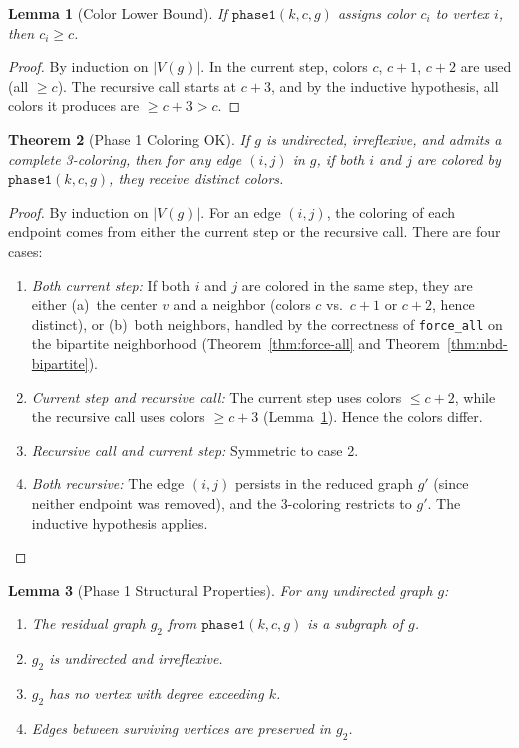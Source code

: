 \documentclass[11pt]{article}
\theoremstyle{plain}
\newtheorem{theorem}{Theorem}[section]
\newtheorem{lemma}[theorem]{Lemma}
\theoremstyle{definition}
\theoremstyle{remark}
\begin{document}
\begin{lemma}[Color Lower Bound]
\label{lem:phase1-lower}
If $\texttt{phase1}(k, c, g)$ assigns color $c_i$ to vertex $i$, then $c_i \ge c$.
\end{lemma}

\begin{proof}
By induction on $|V(g)|$. In the current step, colors $c$, $c{+}1$, $c{+}2$ are used (all $\ge c$). The recursive call starts at $c{+}3$, and by the inductive hypothesis, all colors it produces are $\ge c{+}3 > c$.
\end{proof}

\begin{theorem}[Phase 1 Coloring OK]
\label{thm:phase1-ok}
If $g$ is undirected, irreflexive, and admits a complete 3-coloring, then for any edge $(i,j)$ in $g$, if both $i$ and $j$ are colored by $\texttt{phase1}(k, c, g)$, they receive distinct colors.
\end{theorem}

\begin{proof}
By induction on $|V(g)|$. For an edge $(i,j)$, the coloring of each endpoint comes from either the current step or the recursive call. There are four cases:

\begin{enumerate}[nosep]
  \item \emph{Both current step:} If both $i$ and $j$ are colored in the same step, they are either (a)~the center $v$ and a neighbor (colors $c$ vs.\ $c{+}1$ or $c{+}2$, hence distinct), or (b)~both neighbors, handled by the correctness of \texttt{force\_all} on the bipartite neighborhood (Theorem~\ref{thm:force-all} and Theorem~\ref{thm:nbd-bipartite}).

  \item \emph{Current step and recursive call:} The current step uses colors $\le c{+}2$, while the recursive call uses colors $\ge c{+}3$ (Lemma~\ref{lem:phase1-lower}). Hence the colors differ.

  \item \emph{Recursive call and current step:} Symmetric to case 2.

  \item \emph{Both recursive:} The edge $(i,j)$ persists in the reduced graph $g'$ (since neither endpoint was removed), and the 3-coloring restricts to $g'$. The inductive hypothesis applies.
\end{enumerate}
\end{proof}

\begin{lemma}[Phase 1 Structural Properties]
\label{lem:phase1-structure}
For any undirected graph $g$:
\begin{enumerate}[nosep]
  \item The residual graph $g_2$ from $\texttt{phase1}(k, c, g)$ is a subgraph of $g$.
  \item $g_2$ is undirected and irreflexive.
  \item $g_2$ has no vertex with degree exceeding $k$.
  \item Edges between surviving vertices are preserved in $g_2$.
\end{enumerate}
\end{lemma}
\end{document}
